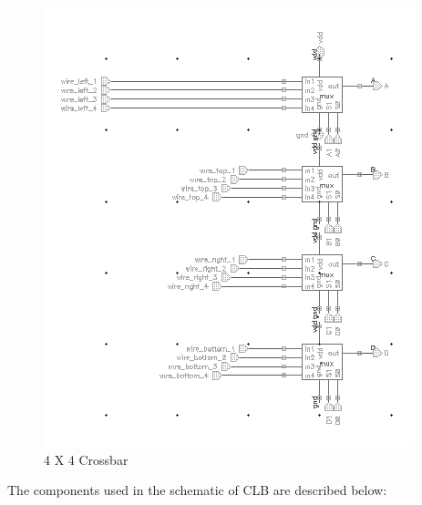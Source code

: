 \begin{figure}[H]
\centering
\includegraphics[scale=1]{4_4_crossbar.png}
\caption{4 X 4 Crossbar}
\label{fig:Figure}
\end{figure}


The components used in the schematic of CLB are described below:

